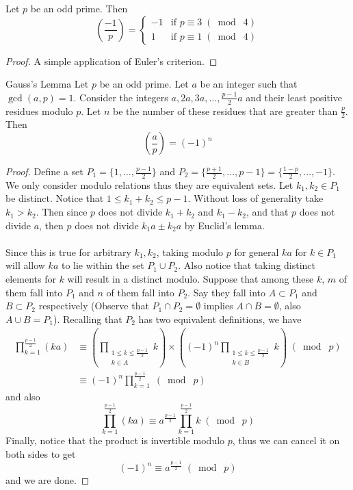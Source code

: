 \begin{crl}{}{} Let $p$ be an odd prime. Then $$\left(\frac{-1}{p}\right)=\begin{cases}
-1 & \text{if }p\equiv 3\;(\bmod\; 4)\\
1 & \text{if }p\equiv 1\;(\bmod\; 4)
\end{cases}$$ \tcbline
\begin{proof}
A simple application of Euler's criterion. 
\end{proof}
\end{crl}

\begin{prp}{Gauss's Lemma}{} Let $p$ be an odd prime. Let $a$ be an integer such that $\gcd(a,p)=1$. Consider the integers $a,2a,3a,\dots,\frac{p-1}{2}a$ and their least positive residues modulo $p$. Let $n$ be the number of these residues that are greater than $\frac{p}{2}$. Then $$\left(\frac{a}{p}\right)=(-1)^n$$ \tcbline
\begin{proof}
Define a set $P_1=\{1,\dots,\frac{p-1}{2}\}$ and $P_2=\{\frac{p+1}{2},\dots,p-1\}=\{\frac{1-p}{2},\dots,-1\}$. We  only consider modulo relations thus they are equivalent sets. Let $k_1,k_2\in P_1$ be distinct. Notice that $1\leq k_1+k_2\leq p-1$. Without loss of generality take $k_1>k_2$. Then since $p$ does not divide $k_1+k_2$ and $k_1-k_2$, and that $p$ does not divide $a$, then $p$ does not divide $k_1a\pm k_2a$ by Euclid's lemma. \\~\\
Since this is true for arbitrary $k_1,k_2$, taking modulo $p$ for general $ka$ for $k\in P_1$ will allow $ka$ to lie within the set $P_1\cup P_2$. Also notice that taking distinct elements for $k$ will result in a distinct modulo. Suppose that among these $k$, $m$ of them fall into $P_1$ and $n$ of them fall into $P_2$. Say they fall into $A\subset P_1$ and $B\subset P_2$ respectively (Observe that $P_1\cap P_2=\emptyset$ implies $A\cap B=\emptyset$, also $A\cup B=P_1$). Recalling that $P_2$ has two equivalent definitions, we have 
\begin{align*}
\prod_{k=1}^{\frac{p-1}{2}}(ka)&\equiv\left(\prod_{\substack{1\leq k\leq \frac{p-1}{2}\\k\in A}}k\right)\times\left((-1)^n\prod_{\substack{1\leq k\leq \frac{p-1}{2}\\k\in B}}k\right)\;(\bmod\;p)\\
&\equiv(-1)^n\prod_{k=1}^{\frac{p-1}{2}}\;(\bmod\;p)
\end{align*}
and also $$\prod_{k=1}^{\frac{p-1}{2}}(ka)\equiv a^{\frac{p-1}{2}}\prod_{k=1}^{\frac{p-1}{2}}k\;(\bmod\;p)$$
Finally, notice that the product is invertible modulo $p$, thus we can cancel it on both sides to get $$(-1)^n\equiv a^{\frac{p-1}{2}}\;(\bmod\;p)$$ and we are done. 
\end{proof}
\end{prp}

